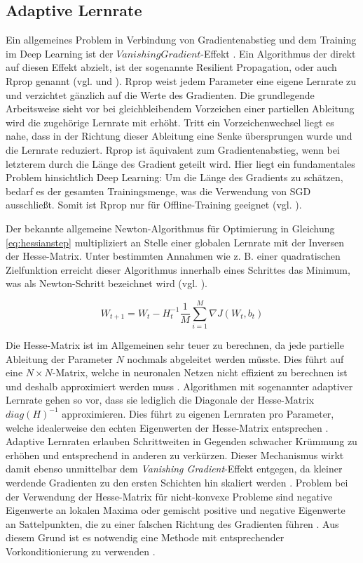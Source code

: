 \subsection{Adaptive Lernrate}
\label{ch:2norder}
Ein allgemeines Problem in Verbindung von Gradientenabstieg und dem Training im Deep Learning ist der $Vanishing Gradient $-Effekt \cite{Hochreiter1991}. Ein Algorithmus der direkt auf diesen Effekt abzielt, ist der sogenannte Resilient Propagation, oder auch Rprop genannt (vgl. \cite{Riedmiller1992} und \cite{Igel2000}). Rprop weist jedem Parameter eine eigene Lernrate zu und verzichtet gänzlich auf die Werte des Gradienten. Die grundlegende Arbeitsweise sieht vor bei gleichbleibendem Vorzeichen einer partiellen Ableitung wird die zugehörige Lernrate mit erhöht. Tritt ein Vorzeichenwechsel liegt es nahe, dass in der Richtung dieser Ableitung eine Senke übersprungen wurde und die Lernrate reduziert. Rprop ist äquivalent zum Gradientenabstieg, wenn bei letzterem durch die Länge des Gradient geteilt wird.
Hier liegt ein fundamentales Problem hinsichtlich Deep Learning: Um die Länge des Gradients zu schätzen, bedarf es der gesamten Trainingsmenge, was die Verwendung von SGD ausschließt. Somit ist Rprop nur für Offline-Training geeignet (vgl. \cite{Hinton2015}).



Der bekannte allgemeine Newton-Algorithmus für Optimierung in Gleichung \ref{eq:hessianstep} multipliziert an Stelle einer globalen Lernrate mit der Inversen der Hesse-Matrix. Unter bestimmten Annahmen wie z. B. einer quadratischen Zielfunktion erreicht dieser Algorithmus innerhalb eines Schrittes das Minimum, was als Newton-Schritt bezeichnet wird (vgl. \cite{Bottou1998}).

\begin{equation}
\label{eq:hessianstep} 
W_{t+1} = W_t - H_t^{-1} \frac{1}{M} \sum_{i=1}^{M} \nabla J(W_t,b_t)
\end{equation}

Die Hesse-Matrix ist im Allgemeinen sehr teuer zu berechnen, da jede partielle Ableitung der Parameter $N$ nochmals abgeleitet werden müsste. Dies führt auf eine $N \times N $-Matrix, welche in neuronalen Netzen nicht effizient zu berechnen ist und deshalb approximiert werden muss \cite[vgl.][]{LeCun1998b}. 
Algorithmen mit sogenannter adaptiver Lernrate gehen so vor, dass sie lediglich die Diagonale der Hesse-Matrix $diag(H)^{-1}$ approximieren. Dies führt zu eigenen Lernraten pro Parameter, welche idealerweise den echten Eigenwerten der Hesse-Matrix entsprechen \cite[vgl.][]{LeCun1998b}. Adaptive Lernraten erlauben Schrittweiten in Gegenden schwacher Krümmung zu erhöhen und entsprechend in anderen zu verkürzen. Dieser Mechanismus wirkt damit ebenso unmittelbar dem \textit{Vanishing Gradient}-Effekt entgegen, da kleiner werdende Gradienten zu den ersten Schichten hin skaliert werden \cite[vgl.][]{Martens2010}. 
Problem bei der Verwendung der Hesse-Matrix für nicht-konvexe Probleme sind negative Eigenwerte an lokalen Maxima oder gemischt positive und negative Eigenwerte an Sattelpunkten, die zu einer falschen Richtung des Gradienten führen \cite[vgl.][]{Dauphin14}. Aus diesem Grund ist es notwendig eine Methode mit entsprechender Vorkonditionierung zu verwenden \cite[vgl.][]{Dauphin2015}.


